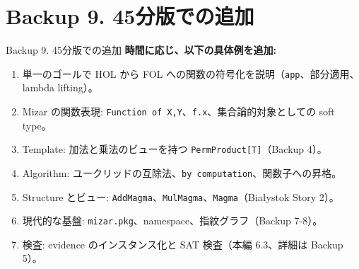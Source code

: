 \documentclass[dvipdfmx,aspectratio=169,11pt]{beamer}
\begin{document}
\section{Backup 9. 45分版での追加}
\begin{frame}[fragile,t]{Backup 9. 45分版での追加}
\smallskip
\textbf{時間に応じ、以下の具体例を追加:}
\begin{enumerate}
\setlength{\itemsep}{1pt}
\setlength{\parsep}{0pt}
\setlength{\parskip}{0pt}
\item 単一のゴールで HOL から FOL への関数の符号化を説明（\texttt{app}、部分適用、lambda lifting）。
\item Mizar の関数表現: \texttt{Function of X,Y}、\texttt{f.x}、集合論的対象としての soft type。
\item Template: 加法と乗法のビューを持つ \texttt{PermProduct[T]}（Backup 4）。
\item Algorithm: ユークリッドの互除法、\texttt{by computation}、関数子への昇格。
\item Structure とビュー: \texttt{AddMagma}、\texttt{MulMagma}、\texttt{Magma}（Bia\l{}ystok Story 2）。
\item 現代的な基盤: \texttt{mizar.pkg}、namespace、指紋グラフ（Backup 7-8）。
\item 検査: evidence のインスタンス化と SAT 検査（本編 6.3、詳細は Backup 5）。
\end{enumerate}
\end{frame}
\end{document}
